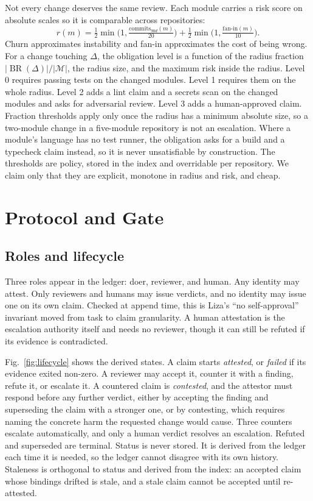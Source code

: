 \documentclass[conference]{IEEEtran}
\newcommand{\BR}{\operatorname{BR}}
\newcommand{\Mods}{\mathcal{M}}
\begin{document}
Not every change deserves the same review. Each module carries a risk score on absolute scales so it is comparable across repositories:
\[
r(m) = \tfrac{1}{2}\min\!\big(1, \tfrac{\text{commits}_{90d}(m)}{20}\big) + \tfrac{1}{2}\min\!\big(1, \tfrac{\text{fan-in}(m)}{10}\big).
\]
Churn approximates instability and fan-in approximates the cost of being wrong. For a change touching $\Delta$, the obligation level is a function of the radius fraction $|\BR(\Delta)|/|\Mods|$, the radius size, and the maximum risk inside the radius. Level 0 requires passing tests on the changed modules. Level 1 requires them on the whole radius. Level 2 adds a lint claim and a secrets scan on the changed modules and asks for adversarial review. Level 3 adds a human-approved claim. Fraction thresholds apply only once the radius has a minimum absolute size, so a two-module change in a five-module repository is not an escalation. Where a module's language has no test runner, the obligation asks for a build and a typecheck claim instead, so it is never unsatisfiable by construction. The thresholds are policy, stored in the index and overridable per repository. We claim only that they are explicit, monotone in radius and risk, and cheap.

\section{Protocol and Gate}

\subsection{Roles and lifecycle}

Three roles appear in the ledger: doer, reviewer, and human. Any identity may attest. Only reviewers and humans may issue verdicts, and no identity may issue one on its own claim. Checked at append time, this is Liza's ``no self-approval'' invariant moved from task to claim granularity. A human attestation is the escalation authority itself and needs no reviewer, though it can still be refuted if its evidence is contradicted.

Fig.~\ref{fig:lifecycle} shows the derived states. A claim starts \emph{attested}, or \emph{failed} if its evidence exited non-zero. A reviewer may accept it, counter it with a finding, refute it, or escalate it. A countered claim is \emph{contested}, and the attestor must respond before any further verdict, either by accepting the finding and superseding the claim with a stronger one, or by contesting, which requires naming the concrete harm the requested change would cause. Three counters escalate automatically, and only a human verdict resolves an escalation. Refuted and superseded are terminal. Status is never stored. It is derived from the ledger each time it is needed, so the ledger cannot disagree with its own history. Staleness is orthogonal to status and derived from the index: an accepted claim whose bindings drifted is stale, and a stale claim cannot be accepted until re-attested.
\end{document}

